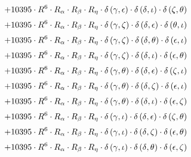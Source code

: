 \begin{subequations}
\begin{gather}
 \\[0.2em] \notag 		 + 10395 \cdot R^{6} \cdot R_{\alpha{}} \cdot R_{\beta{}} \cdot R_{\eta{}} \cdot \delta{}\left(\gamma{}, \epsilon{}\right) \cdot \delta{}\left(\delta{}, \iota{}\right) \cdot \delta{}\left(\zeta{}, \theta{}\right) 
 \\[0.2em] \notag 		 + 10395 \cdot R^{6} \cdot R_{\alpha{}} \cdot R_{\beta{}} \cdot R_{\eta{}} \cdot \delta{}\left(\gamma{}, \zeta{}\right) \cdot \delta{}\left(\delta{}, \epsilon{}\right) \cdot \delta{}\left(\theta{}, \iota{}\right) 
 \\[0.2em] \notag 		 + 10395 \cdot R^{6} \cdot R_{\alpha{}} \cdot R_{\beta{}} \cdot R_{\eta{}} \cdot \delta{}\left(\gamma{}, \zeta{}\right) \cdot \delta{}\left(\delta{}, \theta{}\right) \cdot \delta{}\left(\epsilon{}, \iota{}\right) 
 \\[0.2em] \notag 		 + 10395 \cdot R^{6} \cdot R_{\alpha{}} \cdot R_{\beta{}} \cdot R_{\eta{}} \cdot \delta{}\left(\gamma{}, \zeta{}\right) \cdot \delta{}\left(\delta{}, \iota{}\right) \cdot \delta{}\left(\epsilon{}, \theta{}\right) 
 \\[0.2em] \notag 		 + 10395 \cdot R^{6} \cdot R_{\alpha{}} \cdot R_{\beta{}} \cdot R_{\eta{}} \cdot \delta{}\left(\gamma{}, \theta{}\right) \cdot \delta{}\left(\delta{}, \epsilon{}\right) \cdot \delta{}\left(\zeta{}, \iota{}\right) 
 \\[0.2em] \notag 		 + 10395 \cdot R^{6} \cdot R_{\alpha{}} \cdot R_{\beta{}} \cdot R_{\eta{}} \cdot \delta{}\left(\gamma{}, \theta{}\right) \cdot \delta{}\left(\delta{}, \zeta{}\right) \cdot \delta{}\left(\epsilon{}, \iota{}\right) 
 \\[0.2em] \notag 		 + 10395 \cdot R^{6} \cdot R_{\alpha{}} \cdot R_{\beta{}} \cdot R_{\eta{}} \cdot \delta{}\left(\gamma{}, \theta{}\right) \cdot \delta{}\left(\delta{}, \iota{}\right) \cdot \delta{}\left(\epsilon{}, \zeta{}\right) 
 \\[0.2em] \notag 		 + 10395 \cdot R^{6} \cdot R_{\alpha{}} \cdot R_{\beta{}} \cdot R_{\eta{}} \cdot \delta{}\left(\gamma{}, \iota{}\right) \cdot \delta{}\left(\delta{}, \epsilon{}\right) \cdot \delta{}\left(\zeta{}, \theta{}\right) 
 \\[0.2em] \notag 		 + 10395 \cdot R^{6} \cdot R_{\alpha{}} \cdot R_{\beta{}} \cdot R_{\eta{}} \cdot \delta{}\left(\gamma{}, \iota{}\right) \cdot \delta{}\left(\delta{}, \zeta{}\right) \cdot \delta{}\left(\epsilon{}, \theta{}\right) 
 \\[0.2em] \notag 		 + 10395 \cdot R^{6} \cdot R_{\alpha{}} \cdot R_{\beta{}} \cdot R_{\eta{}} \cdot \delta{}\left(\gamma{}, \iota{}\right) \cdot \delta{}\left(\delta{}, \theta{}\right) \cdot \delta{}\left(\epsilon{}, \zeta{}\right) 

\end{gather}
\end{subequations}
